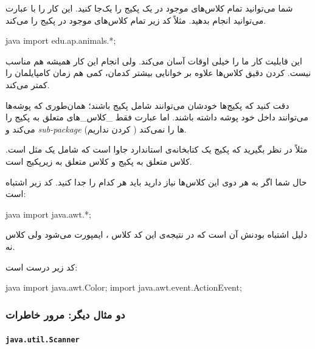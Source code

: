 شما می‌توانید تمام کلاس‌های موجود در یک پکیج را یک‌جا 
کنید. این کار را با عبارت \lr{\texttt{*}} می‌توانید انجام بدهید. مثلاً کد
زیر تمام کلاس‌های موجود در پکیج  را
 می‌کند.

\begin{codebox}{java}
import edu.ap.animals.*;
\end{codebox}

این قابلیت کار ما را خیلی اوقات آسان می‌کند. ولی انجام این کار همیشه هم
مناسب نیست.  کردن دقیق کلاس‌ها علاوه بر خوانایی بیشتر
کدمان، کمی هم زمان کامپایلمان را کمتر می‌کند.

دقت کنید که پکیج‌ها خودشان می‌توانند شامل پکیج باشند؛ همان‌طوری که پوشه‌ها
می‌توانند داخل خود پوشه داشته باشند. اما عبارت \lr{\texttt{*}} فقط
\_کلاس‌\_های متعلق به پکیج را  می‌کند و
\emph{sub-package‌} ها را نمی‌کند (  کردن 
نداریم).

مثلاً در نظر بگیرید که پکیج  یک کتابخانه‌ی استاندارد
جاوا است که شامل یک  مثل 
است. کلاس  متعلق به پکیج  و
کلاس  متعلق به زیرپکیج
 است.

حال شما اگر به هر دوی این کلاس‌ها نیاز دارید باید هر کدام را جدا
 کنید. کد زیر اشتباه است:

\begin{codebox}{java}
import java.awt.*;
\end{codebox}

دلیل اشتباه بودنش آن است که در نتیجه‌ی این کد کلاس  ،
ایمپورت می‌شود ولی کلاس  نه.

کد زیر درست است:

\begin{codebox}{java}
import java.awt.Color;
import java.awt.event.ActionEvent;
\end{codebox}

\subsubsection{دو مثال دیگر: مرور خاطرات}

\paragraph{\texttt{java.util.Scanner}}

